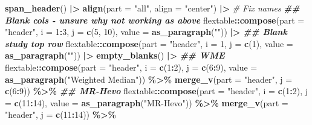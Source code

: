 \documentclass[
]{article}
\newenvironment{Shaded}{\begin{snugshade}}{\end{snugshade}}
\newcommand{\AttributeTok}[1]{\textcolor[rgb]{0.13,0.29,0.53}{#1}}
\newcommand{\CommentTok}[1]{\textcolor[rgb]{0.56,0.35,0.01}{\textit{#1}}}
\newcommand{\DecValTok}[1]{\textcolor[rgb]{0.00,0.00,0.81}{#1}}
\newcommand{\DocumentationTok}[1]{\textcolor[rgb]{0.56,0.35,0.01}{\textbf{\textit{#1}}}}
\newcommand{\FunctionTok}[1]{\textcolor[rgb]{0.13,0.29,0.53}{\textbf{#1}}}
\newcommand{\NormalTok}[1]{#1}
\newcommand{\SpecialCharTok}[1]{\textcolor[rgb]{0.81,0.36,0.00}{\textbf{#1}}}
\newcommand{\StringTok}[1]{\textcolor[rgb]{0.31,0.60,0.02}{#1}}
\begin{document}
\begin{landscape}
\begin{Shaded}
\begin{Highlighting}[]
  \FunctionTok{span\_header}\NormalTok{() }\SpecialCharTok{|\textgreater{}}
  \FunctionTok{align}\NormalTok{(}\AttributeTok{part =} \StringTok{"all"}\NormalTok{, }\AttributeTok{align =} \StringTok{"center"}\NormalTok{) }\SpecialCharTok{|\textgreater{}}
  \CommentTok{\# Fix names }
  \DocumentationTok{\#\# Blank cols {-} unsure why not working as above}
\NormalTok{  flextable}\SpecialCharTok{::}\FunctionTok{compose}\NormalTok{(}\AttributeTok{part =} \StringTok{"header"}\NormalTok{, }\AttributeTok{i =} \DecValTok{1}\SpecialCharTok{:}\DecValTok{3}\NormalTok{, }\AttributeTok{j =} \FunctionTok{c}\NormalTok{(}\DecValTok{5}\NormalTok{, }\DecValTok{10}\NormalTok{), }\AttributeTok{value =} \FunctionTok{as\_paragraph}\NormalTok{(}\StringTok{""}\NormalTok{)) }\SpecialCharTok{|\textgreater{}}
  \DocumentationTok{\#\# Blank study top row}
\NormalTok{  flextable}\SpecialCharTok{::}\FunctionTok{compose}\NormalTok{(}\AttributeTok{part =} \StringTok{"header"}\NormalTok{, }\AttributeTok{i =} \DecValTok{1}\NormalTok{, }\AttributeTok{j =} \FunctionTok{c}\NormalTok{(}\DecValTok{1}\NormalTok{), }\AttributeTok{value =} \FunctionTok{as\_paragraph}\NormalTok{(}\StringTok{""}\NormalTok{)) }\SpecialCharTok{|\textgreater{}}
  \FunctionTok{empty\_blanks}\NormalTok{() }\SpecialCharTok{|\textgreater{}}
  \DocumentationTok{\#\# WME}
\NormalTok{  flextable}\SpecialCharTok{::}\FunctionTok{compose}\NormalTok{(}\AttributeTok{part =} \StringTok{"header"}\NormalTok{, }\AttributeTok{i =} \FunctionTok{c}\NormalTok{(}\DecValTok{1}\SpecialCharTok{:}\DecValTok{2}\NormalTok{), }\AttributeTok{j =} \FunctionTok{c}\NormalTok{(}\DecValTok{6}\SpecialCharTok{:}\DecValTok{9}\NormalTok{), }\AttributeTok{value =} \FunctionTok{as\_paragraph}\NormalTok{(}\StringTok{"Weighted Median"}\NormalTok{)) }\SpecialCharTok{\%\textgreater{}\%} 
  \FunctionTok{merge\_v}\NormalTok{(}\AttributeTok{part =} \StringTok{"header"}\NormalTok{, }\AttributeTok{j =} \FunctionTok{c}\NormalTok{(}\DecValTok{6}\SpecialCharTok{:}\DecValTok{9}\NormalTok{)) }\SpecialCharTok{\%\textgreater{}\%} 
  \DocumentationTok{\#\# MR{-}Hevo}
\NormalTok{  flextable}\SpecialCharTok{::}\FunctionTok{compose}\NormalTok{(}\AttributeTok{part =} \StringTok{"header"}\NormalTok{, }\AttributeTok{i =} \FunctionTok{c}\NormalTok{(}\DecValTok{1}\SpecialCharTok{:}\DecValTok{2}\NormalTok{), }\AttributeTok{j =} \FunctionTok{c}\NormalTok{(}\DecValTok{11}\SpecialCharTok{:}\DecValTok{14}\NormalTok{), }\AttributeTok{value =} \FunctionTok{as\_paragraph}\NormalTok{(}\StringTok{"MR{-}Hevo"}\NormalTok{)) }\SpecialCharTok{\%\textgreater{}\%} 
  \FunctionTok{merge\_v}\NormalTok{(}\AttributeTok{part =} \StringTok{"header"}\NormalTok{, }\AttributeTok{j =} \FunctionTok{c}\NormalTok{(}\DecValTok{11}\SpecialCharTok{:}\DecValTok{14}\NormalTok{)) }\SpecialCharTok{\%\textgreater{}\%} 

\end{Highlighting}
\end{Shaded}
\end{landscape}
\end{document}
